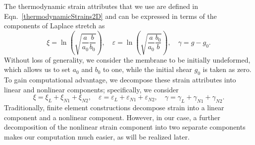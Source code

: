 The thermodynamic strain attributes that we use are defined in Eqn.~\eqref{thermodynamicStrains2D} and can be expressed in terms of the components of Laplace stretch as
\begin{equation}
    \xi = \ln\left( \sqrt{\frac{a}{a_0} \frac{b}{b_0}} \right) ,
    \quad
    \varepsilon = \ln\left(\sqrt{\frac{a}{a_0} \frac{b_0}{b}} \right) ,
    \quad 
    \gamma = g - g_0.
    \label{strainAttributesPentagon}
\end{equation}
Without loss of generality, we consider the membrane to be initially undeformed, which allows us to set $a_0$ and $b_0$ to one, while the initial shear $g_0$ is taken as zero.  To gain computational advantage, we decompose these strain attributes into linear and nonlinear components; specifically, we consider
\begin{equation}
    \xi = \xi_{L} + \xi_{N1} + \xi_{N2} , \quad
    \varepsilon = \varepsilon_{L} + \varepsilon_{N1} + \varepsilon_{N2} , \quad
    \gamma = \gamma_{L} + \gamma_{N1} + \gamma_{N2}.
    \label{totalVirtualStrain}
\end{equation}
Traditionally, finite element constructions decompose strain into a linear component and a non\-linear component.  However, in our case, a further decomposition of the non\-linear strain component into two separate components makes our computation much easier, as will be realized later. 

